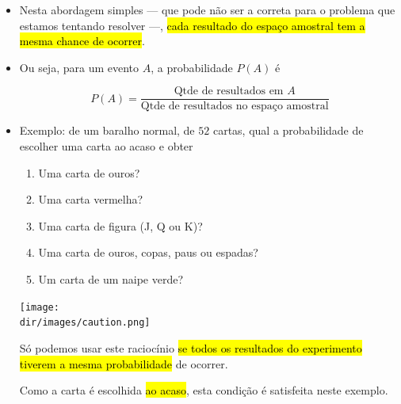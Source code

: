 \documentclass[
  11pt]{report}
\newcommand{\dir}{/ssd/R/x86_64-pc-linux-gnu-library/4.3/fnaufelRmd/rmarkdown/resources}
\newenvironment{rmdcaution}
{
  \begin{mycaution}
    \texttt{[image: \\dir/images/caution.png]}
    \tcblower
  }
  {
  \end{mycaution}
}
\begin{document}
\begin{itemize}
\item
  Nesta abordagem simples --- que pode não ser a correta para o problema que estamos tentando resolver ---, {\hl{cada resultado do espaço amostral tem a mesma chance de ocorrer}}.
\item
  Ou seja, para um evento $A$, a probabilidade $P(A)$ é

  \[
  P(A) = \frac{\text{Qtde de resultados em } A}{\text{Qtde de resultados no espaço amostral}}
  \]
\item
  Exemplo: de um baralho normal, de $52$ cartas, qual a probabilidade de escolher uma carta ao acaso e obter

  \begin{enumerate}
  \def\labelenumi{\arabic{enumi}.}
  \item
    Uma carta de ouros?

  \item
    Uma carta vermelha?

  \item
    Uma carta de figura (J, Q ou K)?

  \item
    Uma carta de ouros, copas, paus ou espadas?

  \item
    Um carta de um naipe verde?

  \end{enumerate}

  \begin{rmdcaution}
  Só podemos usar este raciocínio {\hl{se todos os resultados do experimento tiverem a mesma probabilidade}} de ocorrer.

  Como a carta é escolhida {\hl{ao acaso}}, esta condição é satisfeita neste exemplo.

  \end{rmdcaution}
\end{itemize}
\end{document}
